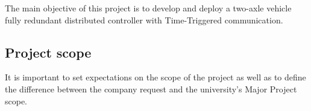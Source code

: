 \documentclass[table,xcdraw]{article}
\begin{document}



The main objective of this project is to develop and deploy a two-axle vehicle fully redundant distributed controller with Time-Triggered communication.\\




\subsection{Project scope}\label{sec:project_scope}

It is important to set expectations on the scope of the project as well as to define the difference between the company request and the university's Major Project scope.\\
\end{document}
